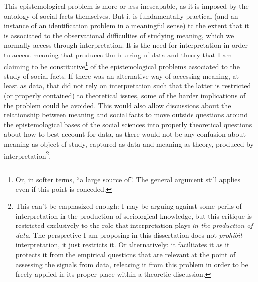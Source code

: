 This epistemological problem is more or less inescapable, as it is imposed by the ontology of social facts themselves.
But it is fundamentally practical (and an instance of an identification problem in a meaningful sense) to the extent that it is associated to the observational difficulties of studying meaning, which we normally access through interpretation.
It is the need for interpretation in order to access meaning that produces the blurring of data and theory that I am claiming to be constitutive\footnote{
    Or, in softer terms, ``a large source of''.
    The general argument still applies even if this point is conceded.
} of the epistemological problems associated to the study of social facts.
If there was an alternative way of accessing meaning, at least as data, that did not rely on interpretation such that the latter is restricted (or properly contained) to theoretical issues, some of the harder implications of the problem could be avoided.
This would also allow discussions about the relationship between meaning and social facts to move outside questions around the epistemological bases of the social sciences into properly theoretical questions about how to best account for data, as there would not be any confusion about meaning as object of study, captured as data and meaning as theory, produced by interpretation\footnote{
    \label{foot:interp1}
    This can't be emphasized enough:
    I may be arguing against some perils of interpretation in the production of sociological knowledge, but this critique is restricted exclusively to the role that interpretation plays \emph{in the production of data}.
    The perspective I am proposing in this dissertation does not \emph{prohibit} interpretation, it just restricts it.
    Or alternatively: it facilitates it as it protects it from the empirical questions that are relevant at the point of assessing the signals from data, releasing it from this problem in order to be freely applied in its proper place within a theoretic discussion.
}.


